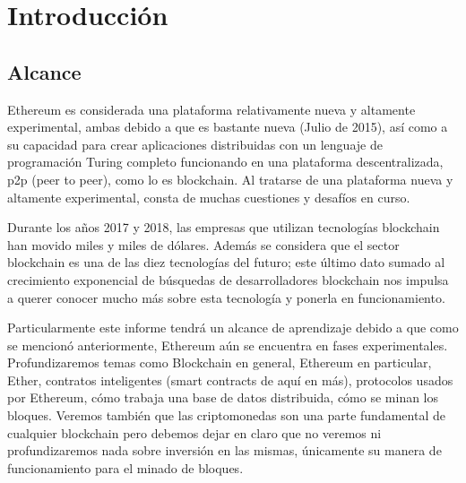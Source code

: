 
\chapter{Introducción}  %

\ifpdf
    \graphicspath{{Chapter1/Figs/Raster/}{Chapter1/Figs/PDF/}{Chapter1/Figs/}}
\else
    \graphicspath{{Chapter1/Figs/Vector/}{Chapter1/Figs/}}
\fi

\section{Alcance} %
Ethereum es considerada una plataforma relativamente nueva y altamente experimental, ambas
debido a que es bastante nueva (Julio de 2015), así como a su capacidad para
crear aplicaciones distribuidas con un lenguaje de programación Turing completo
funcionando en una plataforma descentralizada, p2p (peer to peer), como lo es blockchain.
Al tratarse de una plataforma nueva y altamente experimental, consta de muchas cuestiones y desafíos
en curso.

Durante los años 2017 y 2018, las empresas que utilizan tecnologías blockchain han movido miles y 
miles de dólares. Además se considera que el sector blockchain es una de las diez tecnologías del 
futuro; este último dato sumado al crecimiento exponencial de búsquedas de desarrolladores 
blockchain nos impulsa a querer conocer mucho más sobre esta tecnología y ponerla en funcionamiento.

Particularmente este informe tendrá un alcance de aprendizaje debido a que como se mencionó
anteriormente, Ethereum aún se encuentra en fases experimentales. Profundizaremos temas como
Blockchain en general, Ethereum en particular, Ether, contratos inteligentes (smart contracts de
aquí en más), protocolos usados por Ethereum, cómo trabaja una base de datos distribuida, cómo
se minan los bloques. Veremos también que las criptomonedas son una parte fundamental de cualquier
blockchain pero debemos dejar en claro que no veremos ni profundizaremos nada sobre inversión
en las mismas, únicamente su manera de funcionamiento para el minado de bloques.



